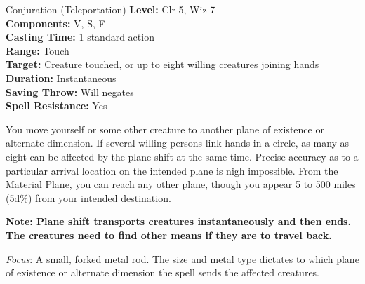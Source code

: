 {Conjuration (Teleportation)}
{
	\textbf{Level:}
	Clr 5, Wiz 7\\
	\textbf{Components:}
	V, S, F\\
	\textbf{Casting Time:}
	1 standard action\\
	\textbf{Range:}
	Touch\\
	\textbf{Target:}
	Creature touched, or up to eight willing creatures joining hands\\
	\textbf{Duration:}
	Instantaneous\\
	\textbf{Saving Throw:}
	Will negates\\
	\textbf{Spell Resistance:}
	Yes\\
}
{
	You move yourself or some other creature to another plane of existence or alternate dimension. If several willing persons link hands in a circle, as many as eight can be affected by the plane shift at the same time. Precise accuracy as to a particular arrival location on the intended plane is nigh impossible. From the Material Plane, you can reach any other plane, though you appear 5 to 500 miles (5d\%) from your intended destination.

	\textbf{Note: Plane shift transports creatures instantaneously and then ends. The creatures need to find other means if they are to travel back.}

	\textit{Focus}:
	A small, forked metal rod. The size and metal type dictates to which plane of existence or alternate dimension the spell sends the affected creatures.

}

